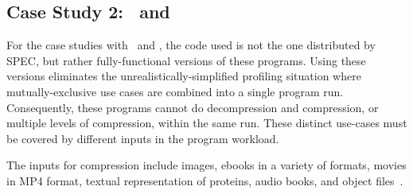 \subsection {Case Study 2: \bzip\  and \gzip}

For the case studies with \bzip\ and \gzip, the code used is not the one distributed by SPEC, but rather fully-functional versions of these programs. Using these versions eliminates the unrealistically-simplified profiling situation where mutually-exclusive use cases are combined into a single program run. Consequently, these programs cannot do decompression and compression, or multiple levels of compression, within the same run.  These distinct use-cases must be covered by different inputs in the program workload.

The inputs for compression include images, ebooks in a variety of formats, movies in MP4 format, textual representation of proteins, audio books, and object files~\cite{BerubePhD}.

